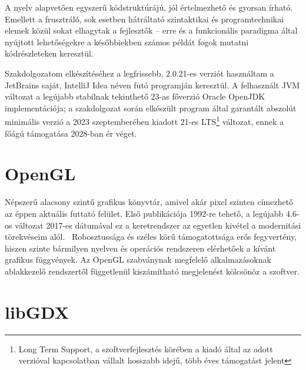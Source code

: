 A nyelv alapvetően egyszerű kódstruktúrájú, jól értelmezhető és gyorsan írható. Emellett a frusztráló, sok esetben hátráltató szintaktikai és programtechnikai elemek közül sokat elhagytak a fejlesztők -- erre és a funkcionális paradigma által nyújtott lehetőségekre a későbbiekben számos példát fogok mutatni kódrészleteken keresztül.

Szakdolgozatom elkészítéséhez a legfrissebb, 2.0.21-es verziót használtam a JetBrains saját, IntelliJ Idea néven futó programján keresztül. A felhasznált JVM változat a legújabb stabilnak tekinthető 23-as főverzió Oracle OpenJDK implementációja; a szakdolgozat során elkészült program által garantált abszolút minimális verzió a 2023 szeptemberében kiadott 21-es LTS\footnote{Long Term Support, a szoftverfejlesztés körében a kiadó által az adott verzióval kapcsolatban vállalt hosszabb idejű, több éves támogatást jelent} változat, ennek a főágú támogatása 2028-ban ér véget.~\cite{JavaRoadmap}

\section{OpenGL }

Népszerű alacsony szintű grafikus könyvtár, amivel akár pixel szinten címezhető az éppen aktuális futtató felület. Első publikációja 1992-re tehető, a legújabb 4.6-os változat 2017-es dátumával ez a keretrendszer az egyetlen kivétel a modernitási törekvéseim alól.~\cite{OpenglHistory} Robosztussága és széles körű támogatottsága erős fegyvertény, hiszen szinte bármilyen nyelven és operációs rendszeren elérhetőek a kívánt grafikus függvények. Az OpenGL szabványnak megfelelő alkalmazásoknak ablakkezelő rendszertől függetlenül kiszámítható megjelenést kölcsönöz a szoftver.

\section{libGDX }

